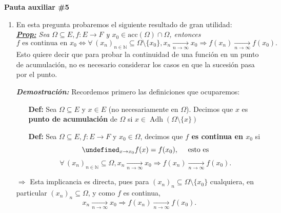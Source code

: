 \documentclass[letterpaper,11pt]{article}
\DeclareMathOperator{\adh}{Adh}
\let\lim=\undefined\DeclareMathOperator*{\lim}{\text{lím}}
\newcommand{\ssi}{\Longleftrightarrow}
\newcommand{\conv}[2]{\xrightarrow[#1\to#2]{}}
\newcommand{\imp}{\Longrightarrow}
\newcommand{\N}{\mathbb{N}}
\newcommand{\dem}{\textbf{\emph{Demostraci\'on: }}}
\begin{document}
\begin{center}
	\LARGE \bf{Pauta auxiliar \#5}\\
\end{center}

\vspace{-1cm}
\begin{enumerate}\setlength{\itemsep}{0.4cm}	
\item[]
\end{enumerate}
\begin{enumerate}
\item En esta pregunta probaremos el siguiente resultado de gran utilidad:\\

\textit{\underline{\textbf{Prop:}} Sea $\Omega \subseteq E, f:E\to F$ y $x_0 \in \text{acc}(\Omega)\cap \Omega$, entonces
\[f \text{ es continua en } x_0 \ssi \forall\,(x_n)_{n\in\N}\subseteq\Omega\setminus\{x_0\}, x_n\conv{n}{\infty}x_0 \imp f(x_n)\conv{n}{\infty}f(x_0).\]
}
Esto quiere decir que para probar la continuidad de una función en un punto de acumulación, no es necesario considerar los casos en que la sucesión pasa por el punto.

\dem Recordemos primero las definiciones que ocuparemos:
\begin{itemize}
    \item[\textbf{Def:}] Sea $\Omega\subseteq E$ y $x\in E$ (no necesariamente en $\Omega$). Decimos que $x$ es \textbf{punto de acumulación} de $\Omega$ si $x\in\adh(\Omega\setminus\{x\})$
    \item[\textbf{Def:}] Sea $\Omega \subseteq E, f:E\to F$ y $x_0 \in \Omega$, decimos que \textbf{$f$ es continua en $x_0$} si 
\[\lim_{x\to x_0}f(x)=f(x_0),\quad\text{ esto es}\]
\[ \forall\,(x_n)_{n\in\N}\subseteq\Omega, x_n\conv{n}{\infty}x_0 \imp f(x_n)\conv{n}{\infty}f(x_0).\]
\end{itemize}   

\underline{$\imp$} Esta implicancia es directa, pues para $(x_n)_n\subseteq \Omega\setminus\{x_0\}$ cualquiera, en particular $(x_n)_n\subseteq \Omega$, y como $f$ es continua,
\[x_n\conv{n}{\infty}x_0 \imp f(x_n)\conv{n}{\infty}f(x_0).\]


\end{enumerate}
\end{document}

